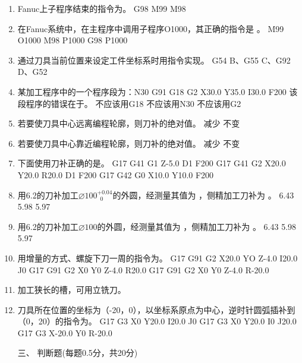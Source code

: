 \documentclass[12pt,twocolumn,landscape,UTF8,twoside]{ctexart}
\begin{document}
\begin{spacing}{1.3}
\begin{enumerate} [1、]
\item Fanuc上子程序结束的指令为。
	{G98}	{M99}	{M98}
\item 在Fanuc系统中，在主程序中调用子程序O1000，其正确的指令是		。
		{M99 O1000}		{M98 P1000}		{G98 P1000}
\item 通过刀具当前位置来设定工件坐标系时用指令实现。
G54		B、G55		C、G92		D、G52
\item 某加工程序中的一个程序段为：N30 G91 G18 G2 X30.0 Y35.0 I30.0 F200 
该段程序的错误在于。
	{不应该用G18}	{不应该用N30}	{不应该用G2}
\item 若要使刀具中心远离编程轮廓，则刀补的绝对值。
	{减少}	{不变}	
\item 若要使刀具中心靠近编程轮廓，则刀补的绝对值。
	{减少}	{不变}	
\item 下面使用刀补正确的是。
{G17 G41 G1 Z-5.0 D1 F200}
{G17 G41 G2 X20.0 Y20.0 R20.0 D1 F200}
{G17 G42 G0 X10.0 Y10.0 F200}
\item 用6.2的刀补加工$\diameter 100^{+0.04}_{~\; 0}$的外圆，经测量其值为 ，侧精加工刀补为	。
	{6.43}	{5.98}	{5.97}
\item 用6.2的刀补加工$\diameter 100$的外圆，经测量其值为 ，侧精加工刀补为	。
	{6.43}	{5.98}	{5.97}
\item 用增量的方式、螺旋下刀一周的指令为。
{G17 G91 G2 X20.0 YO Z-4.0 I20.0 J0}
{G17 G91 G2 X0 Y0 Z-4.0 R20.0}
{G17 G91 G2 X0 Y0 Z-4.0 R-20.0}
\item 加工狭长的槽，可用立铣刀。
\item 刀具所在位置的坐标为（-20，0），以坐标系原点为中心，逆时针圆弧插补到（0，20）的指令为。
	{G17 G3 X0 Y20.0 I20.0 J0}
{G17 G3 X0 Y20.0 I0 J20.0}		{G17 G3 X-20.0 Y0 R-20.0}				
\item[\heiti 三、] { \heiti 判断题(每题0.5分，共20分)}
		

\end{enumerate}
\end{spacing}
\end{document}
